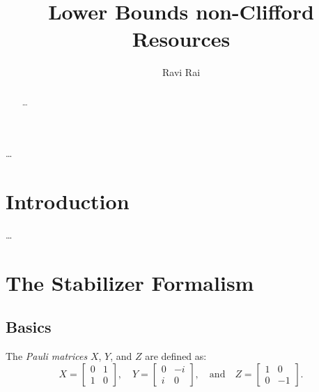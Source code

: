 \documentclass[12pt]{dalthesis}
\begin{document}
\title{Lower Bounds non-Clifford Resources}
\author{Ravi Rai}

\mcs  %




\dedicate{\ldots}

\nolistoftables
\nolistoffigures

\frontmatter

\begin{abstract}
\ldots
\end{abstract}

\begin{acknowledgements}
\ldots
\end{acknowledgements}

\mainmatter

\chapter{Introduction}

\ldots

\chapter{The Stabilizer Formalism}
\section{Basics}

\begin{definition}
The \emph{Pauli matrices} $X$, $Y$, and $Z$ are defined as:
  \[
  X= \begin{bmatrix}
    0 & 1 \\
    1 & 0
  \end{bmatrix}, \quad
  Y = \begin{bmatrix}
  0 & -i \\
  i & 0
  \end{bmatrix}, \quad \mbox{and} \quad
  Z = \begin{bmatrix}
  1 & 0 \\
  0 & -1
  \end{bmatrix}.
  \]
\end{definition}
\end{document}
